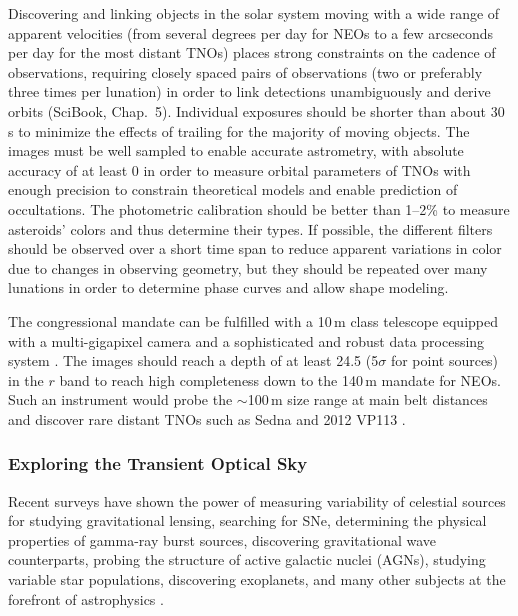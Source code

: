 Discovering and linking objects in the solar system moving with a wide range of apparent velocities (from
several degrees per day for NEOs to a few arcseconds per day for the most distant TNOs) places strong
constraints on the cadence of observations, requiring closely spaced pairs of observations (two or preferably
three times per lunation) in order to link detections unambiguously and derive orbits (SciBook, Chap.~5). Individual
exposures should be shorter than about 30\,s to minimize the effects of trailing for the majority of
moving objects. The images must be well sampled to enable accurate astrometry, with absolute accuracy of at
least 0 in order to measure orbital parameters of TNOs with enough precision to constrain theoretical
models and enable prediction of occultations. The photometric calibration should be
better than 1--2\% to measure asteroids' colors and thus determine
their types.  If possible, the different filters
should be observed over a short time span to reduce apparent
variations in color due to changes in observing geometry, but they should
be repeated over many lunations in order to determine phase curves and allow shape modeling.

The congressional mandate can be fulfilled with a 10\,m class
telescope equipped with a multi-gigapixel camera and a sophisticated
and robust data processing system \citep{2007IAUS..236..353I}. The images should reach a depth of at
least 24.5 (5$\sigma$ for point sources) in the $r$ band to reach high
completeness down to the 140\,m mandate for NEOs.  Such an instrument
would probe the $\sim$100\,m size range at main belt distances and
discover rare distant TNOs such as Sedna \citep{2004ApJ...617..645B}
and 2012 VP113 \citep{2014Natur.507..471T}.


\subsubsection{Exploring the Transient Optical Sky}

Recent surveys have shown the power of measuring variability of
celestial sources for
studying gravitational lensing, searching for SNe, determining
the physical properties of gamma-ray burst sources, discovering
gravitational wave counterparts, probing the structure of active
galactic nuclei (AGNs), studying variable star populations, discovering
exoplanets, and many other subjects at the forefront of astrophysics
\citep[SciBook, Chap.~8;][]{2009PASP..121.1395L,2012IAUS..285..141D,2014ApJ...784...45R}.

